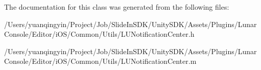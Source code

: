 The documentation for this class was generated from the following files\+:\begin{DoxyCompactItemize}
\item 
/\+Users/yuanqingyin/\+Project/\+Job/\+Slide\+In\+S\+D\+K/\+Unity\+S\+D\+K/\+Assets/\+Plugins/\+Lunar\+Console/\+Editor/i\+O\+S/\+Common/\+Utils/L\+U\+Notification\+Center.\+h\item 
/\+Users/yuanqingyin/\+Project/\+Job/\+Slide\+In\+S\+D\+K/\+Unity\+S\+D\+K/\+Assets/\+Plugins/\+Lunar\+Console/\+Editor/i\+O\+S/\+Common/\+Utils/L\+U\+Notification\+Center.\+m\end{DoxyCompactItemize}
